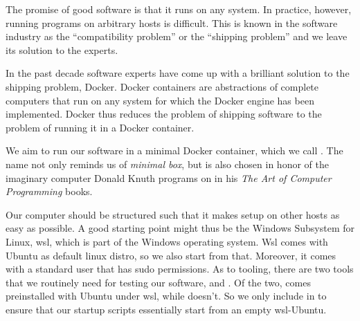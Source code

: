 The promise of good software is that it runs on any system. In
practice, however, running programs on arbitrary hosts is
difficult. This is known in the software industry as the
``compatibility problem'' or the ``shipping problem'' and we leave its
solution to the experts.

In the past decade software experts have come up with a brilliant
solution to the shipping problem, Docker. Docker containers are
abstractions of complete computers that run on any system for which
the Docker engine has been implemented. Docker thus reduces the
problem of shipping software to the problem of running it in a Docker
container.

We aim to run our software in a minimal Docker container, which we
call . The name not only reminds us of \emph{minimal box}, but
is also chosen in honor of the imaginary computer  Donald
Knuth programs on in his \emph{The Art of Computer Programming} books.

Our computer  should be structured such that it makes setup on
other hosts as easy as possible. A good starting point might thus be
the Windows Subsystem for Linux, wsl, which is part of the Windows
operating system. Wsl comes with Ubuntu as default linux distro, so we
also start from that. Moreover, it comes with a standard user that has
sudo permissions. As to tooling, there are two tools that we routinely
need for testing our software,  and . Of the
two,  comes preinstalled with Ubuntu under wsl, while
 doesn't. So we only include  in  to ensure
that our startup scripts essentially start from an empty wsl-Ubuntu.
